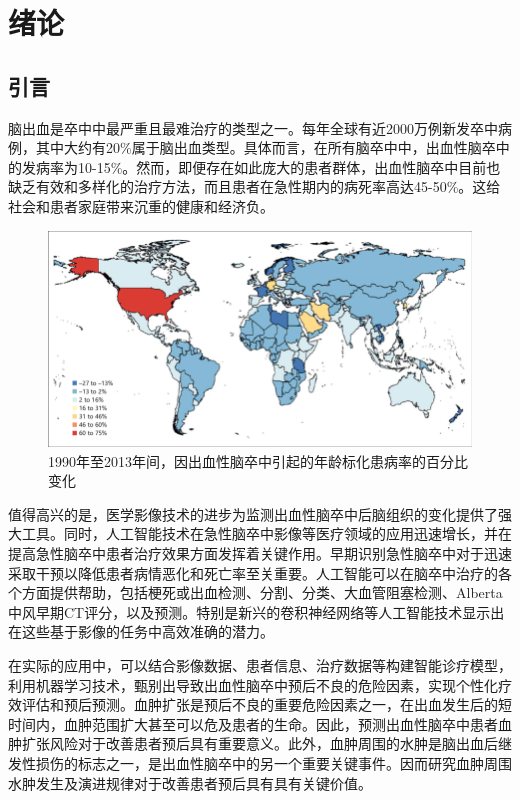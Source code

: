 \documentclass[bwprint]{gmcmthesis}
\begin{document}
\pagestyle{plain}


\section{绪论}

\subsection{引言}

脑出血是卒中中最严重且最难治疗的类型之一。每年全球有近2000万例新发卒中病例，其中大约有20\%属于脑出血类型。具体而言，在所有脑卒中中，出血性脑卒中的发病率为10-15\%。然而，即便存在如此庞大的患者群体，出血性脑卒中目前也缺乏有效和多样化的治疗方法，而且患者在急性期内的病死率高达45-50\%。这给社会和患者家庭带来沉重的健康和经济负\cite{cordonnier2018intracerebral}。

\begin{figure}[!h]
\centering
\includegraphics[width=.7\textwidth]{fig_me/问题背景.png}
\caption{1990年至2013年间，因出血性脑卒中引起的年龄标化患病率的百分比变化\cite{feigin2015atlas}}
\end{figure}

值得高兴的是，医学影像技术的进步为监测出血性脑卒中后脑组织的变化提供了强大工具。同时，人工智能技术在急性脑卒中影像等医疗领域的应用迅速增长，并在提高急性脑卒中患者治疗效果方面发挥着关键作用。早期识别急性脑卒中对于迅速采取干预以降低患者病情恶化和死亡率至关重要。人工智能可以在脑卒中治疗的各个方面提供帮助，包括梗死或出血检测、分割、分类、大血管阻塞检测、Alberta中风早期CT评分，以及预测。特别是新兴的卷积神经网络等人工智能技术显示出在这些基于影像的任务中高效准确的潜力\cite{soun2021artificial}。

在实际的应用中，可以结合影像数据、患者信息、治疗数据等构建智能诊疗模型，利用机器学习技术，甄别出导致出血性脑卒中预后不良的危险因素，实现个性化疗效评估和预后预测。血肿扩张是预后不良的重要危险因素之一，在出血发生后的短时间内，血肿范围扩大甚至可以危及患者的生命。因此，预测出血性脑卒中患者血肿扩张风险对于改善患者预后具有重要意义。此外，血肿周围的水肿是脑出血后继发性损伤的标志之一，是出血性脑卒中的另一个重要关键事件。因而研究血肿周围水肿发生及演进规律对于改善患者预后具有具有关键价值\cite{wagner2004hematoma,zheng2016mechanism}。
\end{document}
